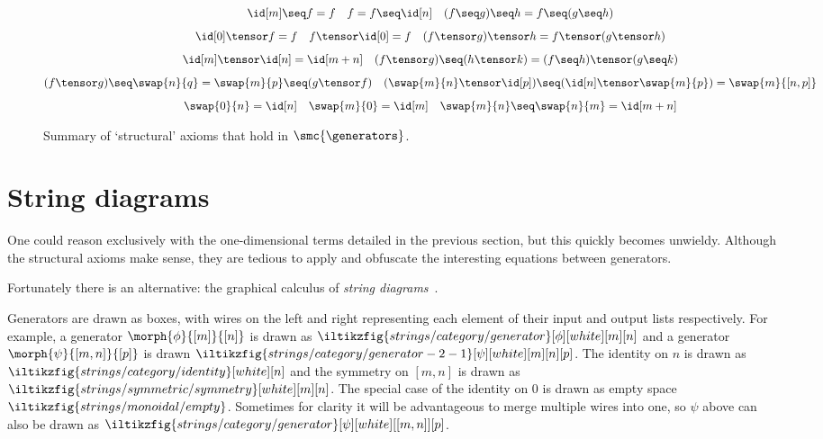 \begin{figure}
    \centering
    \begin{gather*}
        \id[m] \seq  f = f
        \quad
        f = f \seq \id[n]
        \quad
        (f \seq g) \seq h = f \seq (g \seq h)
        \\[0.5em]
        \id[0] \tensor f = f
        \quad
        f \tensor \id[0] = f
        \quad
        (f \tensor g) \tensor h = f \tensor (g \tensor h)
        \\[0.5em]
        \id[m] \tensor \id[n] = \id[m+n]
        \quad
        (f \tensor g) \seq (h \tensor k) = (f \seq h) \tensor (g \seq k)
        \\[0.5em]
        (f \tensor g) \seq \swap{n}{q} = \swap{m}{p} \seq (g \tensor f)
        \quad
        (\swap{m}{n} \tensor \id[p]) \seq (\id[n] \tensor \swap{m}{p}) = \swap{m}{[n,p]}
        \\[0.5em]
        \swap{0}{n} = \id[n]
        \quad
        \swap{m}{0} = \id[m]
        \quad
        \swap{m}{n} \seq \swap{n}{m} = \id[m+n]
    \end{gather*}
    \caption{Summary of `structural' axioms that hold in \(\smc{\generators}\).}
    \label{fig:structural-equations}
\end{figure}

\section{String diagrams}

One could reason exclusively with the one-dimensional terms detailed in the
previous section, but this quickly becomes unwieldy.
Although the structural axioms make sense, they are tedious to apply and
obfuscate the interesting equations between generators.

Fortunately there is an alternative: the graphical calculus of
\emph{string diagrams}~\cite{joyal1991geometry}.


Generators are drawn as boxes, with wires on the left and right representing
each element of their input and output lists respectively.
For example, a generator \(\morph{\phi}{[m]}{[n]}\) is drawn as \(
    \iltikzfig{strings/category/generator}[\phi][white][m][n]
\) and a generator \(\morph{\psi}{[m,n]}{[p]}\) is drawn \(
    \iltikzfig{strings/category/generator-2-1}[\psi][white][m][n][p]
\).
The identity on \(n\) is drawn as \(
    \iltikzfig{strings/category/identity}[white][n]
\) and the symmetry on \([m, n]\) is drawn as \(
    \iltikzfig{strings/symmetric/symmetry}[white][m][n]
\).
The special case of the identity on \(0\) is drawn as empty space \(
    \iltikzfig{strings/monoidal/empty}
\).
Sometimes for clarity it will be advantageous to merge multiple wires into one,
so \(\psi\) above can also be drawn as \(
    \iltikzfig{strings/category/generator}[\psi][white][[m,n]][p]
\).

